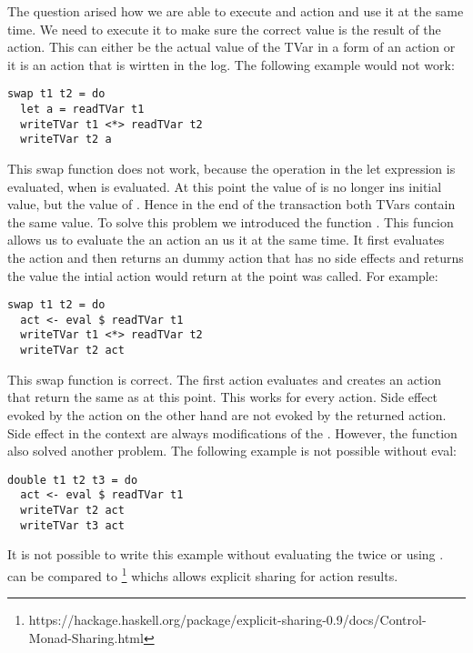The question arised how we are able to execute and action and use it at the same time. We need to execute it to make sure 
the correct value is the result of the action. This can either be the actual value of the TVar in a form of an  
action or it is an  action that is wirtten in the log. The following example would not work:
\begin{lstlisting}
swap t1 t2 = do
  let a = readTVar t1
  writeTVar t1 <*> readTVar t2
  writeTVar t2 a
\end{lstlisting}
This swap function does not work, because the  operation in the let expression is evaluated, when 
 is evaluated. At this point the value of  is no longer ins initial value, but the 
value of . Hence in the end of the transaction both TVars contain the same value. To solve this problem
we introduced the function . This funcion allows us to evaluate the an 
 action an us it at the same time. It first evaluates the  action and then returns an 
dummy action that has no side effects and returns the value the intial action would return at the point 
was called. For example:
\begin{lstlisting}
swap t1 t2 = do
  act <- eval $ readTVar t1
  writeTVar t1 <*> readTVar t2
  writeTVar t2 act
\end{lstlisting}
This swap function is correct. The first action evaluates  and creates an action that return 
the same as  at this point. This works for every  action. Side effect evoked by the 
action on the other hand are not evoked by the returned action. Side effect in the context  are always 
modifications of the . However, the  function also solved another problem. The following
example is not possible without eval:
\begin{lstlisting}
double t1 t2 t3 = do 
  act <- eval $ readTVar t1
  writeTVar t2 act
  writeTVar t3 act
\end{lstlisting}
It is not possible to write this example without evaluating the  twice or using . 
 can be compared to \footnote{https://hackage.haskell.org/package/explicit-sharing-0.9/docs/Control-Monad-Sharing.html}
whichs allows explicit sharing for action results.

